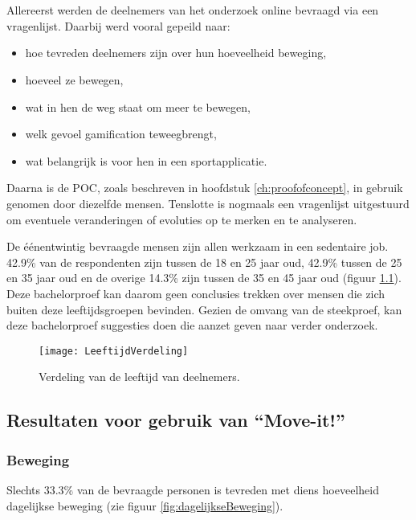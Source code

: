 \chapter{}%
\label{ch:analyse}

Allereerst werden de deelnemers van het onderzoek online bevraagd via een vragenlijst. Daarbij werd vooral gepeild naar:
\begin{itemize}
    \item hoe tevreden deelnemers zijn over hun hoeveelheid beweging,
    \item hoeveel ze bewegen,
    \item wat in hen de weg staat om meer te bewegen,
    \item welk gevoel gamification teweegbrengt,
    \item wat belangrijk is voor hen in een sportapplicatie.
\end{itemize}

Daarna is de POC, zoals beschreven in hoofdstuk \ref{ch:proofofconcept}, in gebruik genomen door diezelfde mensen. Tenslotte is nogmaals een vragenlijst uitgestuurd om eventuele veranderingen of evoluties op te merken en te analyseren.

De éénentwintig bevraagde mensen zijn allen werkzaam in een sedentaire job. 42.9\% van de respondenten zijn tussen de 18 en 25 jaar oud, 42.9\% tussen de 25 en 35 jaar oud en de overige 14.3\% zijn tussen de 35 en 45 jaar oud (figuur \ref{fig:leeftijd}). Deze bachelorproef kan daarom geen conclusies trekken over mensen die zich buiten deze leeftijdsgroepen bevinden. Gezien de omvang van de steekproef, kan deze bachelorproef  suggesties doen die aanzet geven naar verder onderzoek.

\begin{figure}
    \caption[Verdeling van de leeftijd van deelnemers]{Verdeling van de leeftijd van deelnemers.}
    \texttt{[image: LeeftijdVerdeling]}
    \label{fig:leeftijd}
\end{figure}

\section{Resultaten voor gebruik van ``Move-it!''}

\subsection{Beweging}
Slechts 33.3\% van de bevraagde personen is tevreden met diens hoeveelheid dagelijkse beweging (zie figuur \ref{fig:dagelijkseBeweging}).


